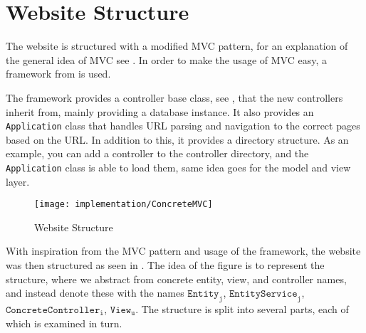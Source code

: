 \section{Website Structure}\label{sec:websitestructure}
The website is structured with a modified MVC pattern, for an explanation of the general idea of MVC see .
In order to make the usage of MVC easy, a framework from \citep{misc:mvc-framework} is used.

The framework provides a controller base class, see , that the new controllers inherit from, mainly providing a database instance.
It also provides an \texttt{Application} class that handles URL parsing and navigation to the correct pages based on the URL.
In addition to this, it provides a directory structure. As an example, you can add a controller to the controller directory, and the \texttt{Application} class is able to load them, same idea goes for the model and view layer.

\begin{figure}
	\centering
	\texttt{[image: implementation/ConcreteMVC]}
	\caption{Website Structure}\label{fig:websitestructure}
\end{figure}

With inspiration from the MVC pattern and usage of the framework, the website was then structured as seen in .
The idea of the figure is to represent the structure, where we abstract from concrete entity, view, and controller names, and instead denote these with the names $\texttt{Entity}_\texttt{j}$, $\texttt{EntityService}_\texttt{j}$, $\texttt{ConcreteController}_\texttt{i}$, $\texttt{View}_\texttt{u}$.
The structure is split into several parts, each of which is examined in turn. 

